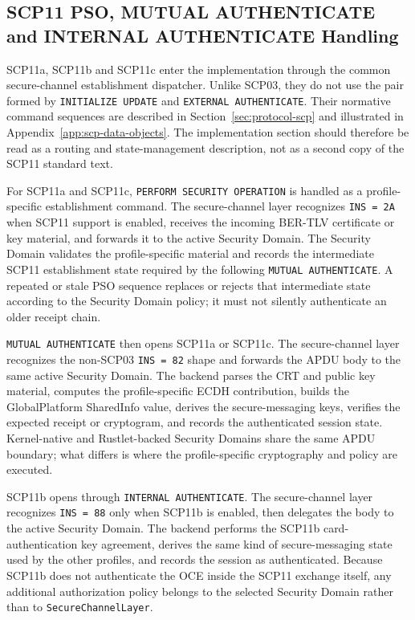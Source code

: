 \subsection{SCP11 PSO, MUTUAL AUTHENTICATE and INTERNAL AUTHENTICATE Handling}
\label{sec:impl-scp11-establishment}

SCP11a, SCP11b and SCP11c enter the implementation through the common
secure-channel establishment dispatcher. Unlike SCP03, they do not use the
pair formed by \texttt{INITIALIZE UPDATE} and
\texttt{EXTERNAL AUTHENTICATE}. Their normative command sequences are described
in Section~\ref{sec:protocol-scp} and illustrated in
Appendix~\ref{app:scp-data-objects}. The implementation section should
therefore be read as a routing and state-management description, not as a
second copy of the SCP11 standard text.

For SCP11a and SCP11c, \texttt{PERFORM SECURITY OPERATION} is handled as a
profile-specific establishment command. The secure-channel layer recognizes
\texttt{INS = 2A} when SCP11 support is enabled, receives the incoming BER-TLV
certificate or key material, and forwards it to the active Security Domain. The
Security Domain validates the profile-specific material and records the
intermediate SCP11 establishment state required by the following
\texttt{MUTUAL AUTHENTICATE}. A repeated or stale PSO sequence replaces or
rejects that intermediate state according to the Security Domain policy; it
must not silently authenticate an older receipt chain.

\texttt{MUTUAL AUTHENTICATE} then opens SCP11a or SCP11c. The secure-channel
layer recognizes the non-SCP03 \texttt{INS = 82} shape and forwards the APDU
body to the same active Security Domain. The backend parses the CRT and public
key material, computes the profile-specific ECDH contribution, builds the
GlobalPlatform SharedInfo value, derives the secure-messaging keys, verifies
the expected receipt or cryptogram, and records the authenticated session
state. Kernel-native and Rustlet-backed Security Domains share the same APDU
boundary; what differs is where the profile-specific cryptography and policy
are executed.

SCP11b opens through \texttt{INTERNAL AUTHENTICATE}. The secure-channel layer
recognizes \texttt{INS = 88} only when SCP11b is enabled, then delegates the
body to the active Security Domain. The backend performs the SCP11b
card-authentication key agreement, derives the same kind of secure-messaging
state used by the other profiles, and records the session as authenticated.
Because SCP11b does not authenticate the OCE inside the SCP11 exchange itself,
any additional authorization policy belongs to the selected Security Domain
rather than to \texttt{SecureChannelLayer}.

